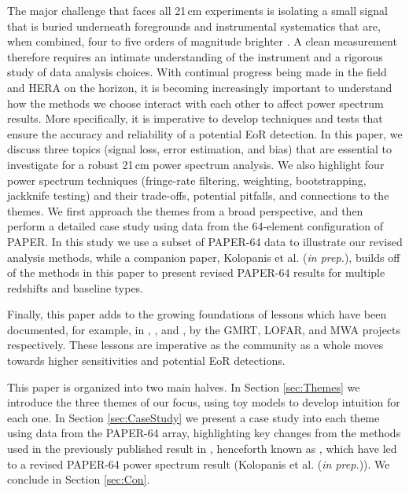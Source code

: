 \documentclass[preprint2,numberedappendix,tighten]{aastex6}  %
\begin{document}
The major challenge that faces all 21\,cm experiments is isolating a small signal that is buried underneath foregrounds and 
instrumental systematics that are, when combined, four to five orders of magnitude brighter \citep[e.g.,][]{santos_et_al2005, ali_et_al2008, deOliveiraCosta_et_al2008, jelic_et_al2008, bernardi_et_al2009, bernardi_et_al2010, ghosh_et_al2011, pober_et_al2013b, bernardi_et_al2013, dillon_et_al2014, kohn_et_al2016}. A clean measurement therefore requires an intimate understanding of the instrument and a rigorous study of data analysis choices. With continual progress being made 
in the field and HERA on the horizon, it is becoming increasingly important to understand how the methods we choose interact 
with each other to affect power spectrum results. More specifically, it is imperative to develop techniques and tests that ensure 
the accuracy and reliability of a potential EoR detection. In this paper, we discuss three topics (signal loss, error estimation, and bias) that are essential to investigate 
for a robust 21\,cm power spectrum analysis. We also highlight four power spectrum techniques (fringe-rate filtering, weighting, bootstrapping, jackknife testing) and their trade-offs, potential 
pitfalls, and connections to the themes. We first approach the themes from a broad perspective, and then perform a detailed 
case study using data from the 64-element configuration of PAPER. In this study we use a subset of PAPER-64 data to illustrate our revised analysis methods, while a companion paper, Kolopanis et al. (\textit{in prep.}), builds off of the methods in this paper to present revised PAPER-64 results for multiple redshifts and baseline types.

Finally, this paper adds to the growing foundations of lessons which have been documented, for example, in \citet{Paciga2013}, \citet{Patil2016}, and \citet{Jacobs2016}, by the GMRT, LOFAR, and MWA projects respectively. These lessons are imperative as the community as a whole moves towards higher sensitivities and potential EoR detections.

This paper is organized into two main halves. In Section \ref{sec:Themes} we introduce the three themes of our focus, using 
toy models to develop intuition for each one. In Section \ref{sec:CaseStudy} we present a case study into each theme using data 
from the PAPER-64 array, highlighting key changes from the methods used in the previously published result in \citet{ali_et_al2015}, henceforth known as , which have led to a 
revised PAPER-64 power spectrum result (Kolopanis et al. (\textit{in prep.})). We conclude in Section \ref{sec:Con}.
\end{document}
